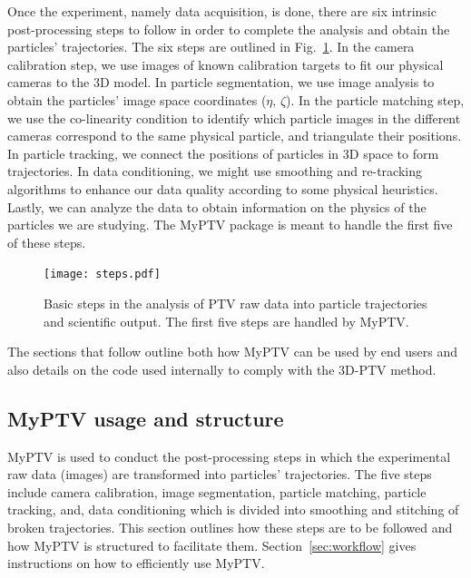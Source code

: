 \documentclass[10pt,a4paper]{article}
\begin{document}
Once the experiment, namely data acquisition, is done, there are six intrinsic post-processing steps to follow in order to complete the analysis and obtain the particles' trajectories. The six steps are outlined in Fig.~\ref{fig:steps}. In the camera calibration step, we use images of known calibration targets to fit our physical cameras to the 3D model. In particle segmentation, we use image analysis to obtain the particles' image space coordinates ($\eta, \, \zeta$). In the particle matching step, we use the co-linearity condition to identify which particle images in the different cameras correspond to the same physical particle, and triangulate their positions. In particle tracking, we connect the positions of particles in 3D space to form trajectories. In data conditioning, we might use smoothing and re-tracking algorithms to enhance our data quality according to some physical heuristics. Lastly, we can analyze the data to obtain information on the physics of the particles we are studying. The MyPTV package is meant to handle the first five of these steps.    



\begin{figure}
	\centering
	\texttt{[image: steps.pdf]}
	\caption{Basic steps in the analysis of PTV raw data into particle trajectories and scientific output. The first five steps are handled by MyPTV. \label{fig:steps}}
\end{figure}


The sections that follow outline both how MyPTV can be used by end users and also details on the code used internally to comply with the 3D-PTV method.








\subsection{MyPTV usage and structure}


MyPTV is used to conduct the post-processing steps in which the experimental raw data (images) are transformed into particles' trajectories. The five steps include camera calibration, image segmentation, particle matching, particle tracking, and, data conditioning which is divided into smoothing and stitching of broken trajectories. This section outlines how these steps are to be followed and how MyPTV is structured to facilitate them. Section~\ref{sec:workflow} gives instructions on how to efficiently use MyPTV. 
\end{document}
